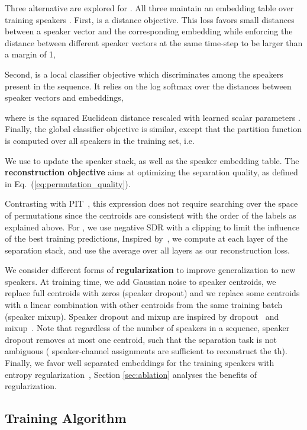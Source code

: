 \documentclass[letterpaper, onecolumn,10 pt]{IEEEtran}
\begin{document}
Three alternative are explored for . All three maintain
an embedding table over training speakers . First, 
 is a distance objective. This loss
favors small distances between a speaker vector and the corresponding embedding
while enforcing the distance between different speaker vectors at the same time-step to 
be larger than a margin of 1,

Second,  is a local classifier objective
which discriminates among the speakers present in the
sequence. It relies on the log softmax over the distances
between speaker vectors and embeddings,

where 
is the squared Euclidean distance rescaled with learned scalar parameters .
Finally, the global classifier objective  is similar,
except that the partition function is computed over all speakers in the training set,
i.e. 

We use  to update the speaker stack, as well as the speaker embedding table.
The {\bf reconstruction objective} aims at optimizing the separation quality, as 
defined in Eq.~(\ref{eq:permutation_quality}). 

Contrasting with PIT~\cite{yu17:pit}, this expression 
does not require searching over the space of permutations since the centroids  are 
consistent with the order of the labels  as explained above.
For , we use negative SDR with a clipping 
 to limit the influence of the best training predictions,
\mbox{}
Inspired by~\cite{nachmani2020voice}, we compute  at each layer of the separation
stack, and use the average over all layers as our reconstruction loss.

We consider different forms of {\bf regularization} to improve generalization to new speakers. At training time, we add Gaussian noise to speaker centroids, we replace full centroids with zeros (speaker dropout) and we replace some centroids with a linear combination with other centroids from the same training batch (speaker mixup). Speaker dropout and mixup are inspired by dropout~\cite{srivastava14:dropout} and mixup~\cite{zhang17:mixup}. Note that regardless of the number of speakers in a sequence, speaker dropout removes at most one centroid, such that the separation task is not ambiguous ( speaker-channel assignments are sufficient to reconstruct the th). Finally, we favor well separated embeddings for the training speakers with entropy regularization~\cite{sablayrolles19spreading},
\mbox{}
Section \ref{sec:ablation} analyses the benefits of regularization. 

\subsection{Training Algorithm}
\end{document}

